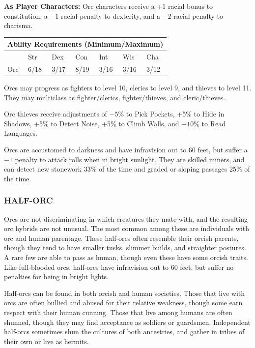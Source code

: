 \begin{multicols}{2}
\textbf{As Player Characters:} Orc characters receive a +1 racial bonus to constitution, a $-1$ racial penalty to dexterity, and a $-2$ racial penalty to charisma.

\noindent \begin{minipage}{\columnwidth}

\noindent \begin{tabular}{|p{}|p{}|p{}|p{}|p{}|p{}|p{}|}
\multicolumn{7}{c}{Ability Requirements (Minimum/Maximum)} \\
\hline
	& Str	& Dex	& Con	& Int	& Wis	& Cha	\\
\hline\hline
\rowcolor[gray]{.9}Orc	& 6/18	& 3/17	& 8/19	& 3/16	& 3/16	& 3/12	\\
\hline
\end{tabular}

\end{minipage}

Orcs may progress as fighters to level 10, clerics to level 9, and thieves to level 11. They may multiclass as fighter/clerics, fighter/thieves, and cleric/thieves.

Orc thieves receive adjustments of $-5$\% to Pick Pockets, +5\% to Hide in Shadows, +5\% to Detect Noise, +5\% to Climb Walls, and $-10$\% to Read Languages.

Orcs are accustomed to darkness and have infravision out to 60 feet, but suffer a $-1$ penalty to attack rolls when in bright sunlight. They are skilled miners, and can detect new stonework 33\% of the time and graded or sloping passages 25\% of the time.

\subsubsection{HALF-ORC}

Orcs are not discriminating in which creatures they mate with, and the resulting orc hybrids are not unusual. The most common among these are individuals with orc and human parentage. These half-orcs often resemble their orcish parents, though they tend to have smaller tusks, slimmer builds, and straighter postures. A rare few are able to pass as human, though even these have some orcish traits. Like full-blooded orcs, half-orcs have infravision out to 60 feet, but suffer no penalties for being in bright lights.

Half-orcs can be found in both orcish and human societies. Those that live with orcs are often bullied and abused for their relative weakness, though some earn respect with their human cunning. Those that live among humans are often shunned, though they may find acceptance as soldiers or guardsmen. Independent half-orcs sometimes shun the cultures of both ancestries, and gather in tribes of their own or live as hermits.


\end{multicols}
